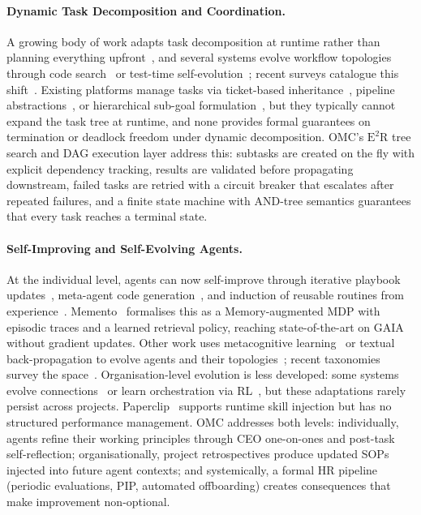 \documentclass[11pt,a4paper]{article}
\begin{document}
\paragraph{Dynamic Task Decomposition and Coordination.}
A growing body of work adapts task decomposition at runtime rather than planning everything upfront~\cite{wang2025tdag, erdogan2025planact, paglieri2025learnplan}, and several systems evolve workflow topologies through code search~\cite{zhang2025aflow} or test-time self-evolution~\cite{hu2025evomac}; recent surveys catalogue this shift~\cite{yu2025workflowsurvey, huang2025plansurvey}.  Existing platforms manage tasks via ticket-based inheritance~\cite{paperclip2025}, pipeline abstractions~\cite{gao2025agentscope}, or hierarchical sub-goal formulation~\cite{agentorchestra2025}, but they typically cannot expand the task tree at runtime, and none provides formal guarantees on termination or deadlock freedom under dynamic decomposition.  OMC's $\text{E}^2$R tree search and DAG execution layer address this: subtasks are created on the fly with explicit dependency tracking, results are validated before propagating downstream, failed tasks are retried with a circuit breaker that escalates after repeated failures, and a finite state machine with AND-tree semantics guarantees that every task reaches a terminal state.

\paragraph{Self-Improving and Self-Evolving Agents.}
At the individual level, agents can now self-improve through iterative playbook updates~\cite{zhang2026ace}, meta-agent code generation~\cite{hu2025adas}, and induction of reusable routines from experience~\cite{wang2025awm, xu2025agenttrek}.  Memento~\cite{zhou2025memento} formalises this as a Memory-augmented MDP with episodic traces and a learned retrieval policy, reaching state-of-the-art on GAIA~\cite{mialon2023gaiabenchmarkgeneralai} without gradient updates.  Other work uses metacognitive learning~\cite{metacognitive2025} or textual back-propagation to evolve agents and their topologies~\cite{hu2025evomac}; recent taxonomies survey the space~\cite{fang2025selfevosurvey, gao2025selfevosurvey}.  Organisation-level evolution is less developed: some systems evolve connections~\cite{hu2025evomac} or learn orchestration via RL~\cite{dang2025evolving, yuen2025intrinsic}, but these adaptations rarely persist across projects.  Paperclip~\cite{paperclip2025} supports runtime skill injection but has no structured performance management.  OMC addresses both levels: individually, agents refine their working principles through CEO one-on-ones and post-task self-reflection; organisationally, project retrospectives produce updated SOPs injected into future agent contexts; and systemically, a formal HR pipeline (periodic evaluations, PIP, automated offboarding) creates consequences that make improvement non-optional.
\end{document}
